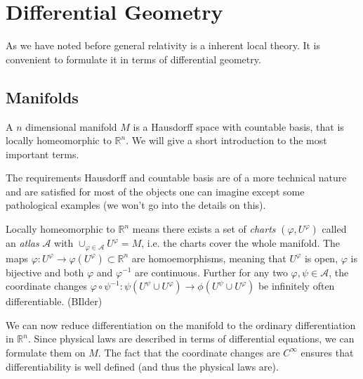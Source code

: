\chapter{Differential Geometry}
As we have noted before general relativity is a inherent local theory. It is convenient to formulate it in terms of differential geometry.
\section{Manifolds}
\begin{definition}
A $n$ dimensional manifold $M$ is a Hausdorff space with countable basis, that
is locally homeomorphic to $\mathbb{R}^n$. We will give a short introduction to
the most important terms.
\end{definition}
\begin{remark}
The requirements Hausdorff and countable basis are of a more technical nature and are satisfied for most of the objects one can imagine 
except some pathological examples (we won't go into the details on this).

Locally homeomorphic to $\mathbb{R}^n$ means there exists a set of \emph{charts} 
$(\varphi,U^\varphi)$ called an \emph{atlas} $\mathcal{A}$ with $\cup_{\varphi\in\mathcal{A}} U^\varphi =M$, 
i.e. the charts cover the whole manifold. The maps $\varphi:U^\varphi\to \varphi(U^\varphi)\subset\mathbb{R}^n $ are homoemorphisms, 
meaning that $U^\varphi$ is open, $\varphi$ is bijective and both $\varphi$ and $\varphi^{-1}$ are continuous.
Further for any two $\varphi,\psi\in \mathcal{A}$, the coordinate changes 
$\varphi\circ\psi^{-1}:\psi(U^\psi\cup U^\varphi)\to \phi(U^\psi\cup U^\varphi)$ be infinitely often differentiable.
(BIlder)
\end{remark}

We can now reduce differentiation on the manifold to the ordinary differentiation in $\mathbb{R}^n$. 
Since physical laws are described in terms of differential equations, we can formulate them on $M$. 
The fact that the coordinate changes are $C^\infty$ ensures that differentiability is well defined (and thus the physical laws are).

